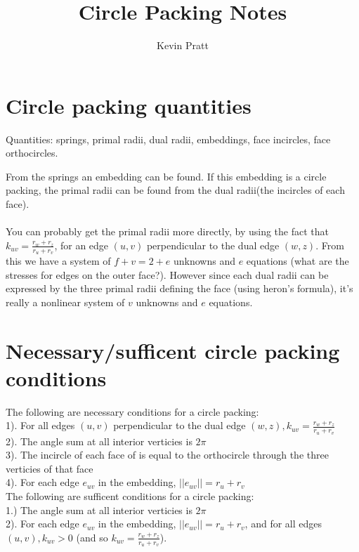 \documentclass{article}
\title{Circle Packing Notes}
\author{Kevin Pratt}
\begin{document}
\maketitle

\section{Circle packing quantities}

Quantities: springs, primal radii, dual radii, embeddings, face incircles, face orthocircles.

From the springs an embedding can be found. If this embedding is a circle packing, the primal radii can be found from the dual radii(the incircles of each face).

\paragraph{}
You can probably get the primal radii more directly, by using the fact that $k_{uv} = \frac{r_w+r_z}{r_u+r_v}$, for an edge $(u,v)$ perpendicular to the dual edge $(w,z)$. From this we have a system of $f+v=2+e$ unknowns and $e$ equations (what are the stresses for edges on the outer face?). However since each dual radii can be expressed by the three primal radii defining the face (using heron's formula), it's really a nonlinear system of $v$ unknowns and $e$ equations.

\section{Necessary/sufficent circle packing conditions}

The following are necessary conditions for a circle packing:\\
1). For all edges $(u,v)$ perpendicular to the dual edge $(w,z), k_{uv} = \frac{r_w+r_z}{r_u+r_v}$\\
2). The angle sum at all interior verticies is $2\pi$ \\
3). The incircle of each face of is equal to the orthocircle through the three verticies of that face\\
4). For each edge $e_{uv}$ in the embedding, $||e_{uv}||=r_u+r_v$\\

The following are sufficent conditions for a circle packing:\\
1.) The angle sum at all interior verticies is $2\pi$ \\
2). For each edge $e_{uv}$ in the embedding, $||e_{uv}||=r_u+r_v$, and for all edges 
$(u,v), k_{uv}>0$ (and so $k_{uv} = \frac{r_w+r_z}{r_u+r_v}$).\\
\end{document}
